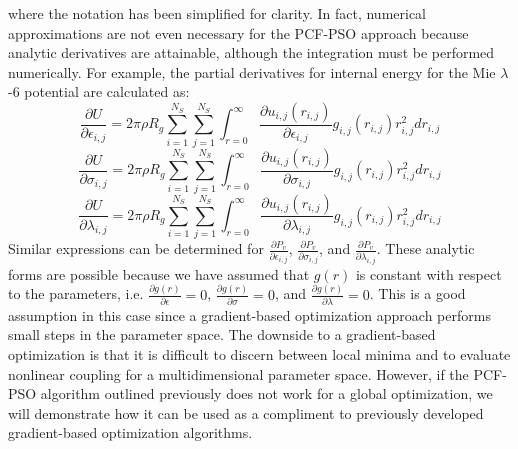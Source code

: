 \documentclass[12pt]{article}
\begin{document}
where the notation has been simplified for clarity. In fact, numerical approximations are not even necessary for the PCF-PSO approach because analytic derivatives are attainable, although the integration must be performed numerically. For example, the partial derivatives for internal energy for the Mie $\lambda$-6 potential are calculated as:
\begin{equation} \label{U_Eps}
\frac{\partial U}{\partial \epsilon_{i,j}} = 2 \pi \rho R_g \sum_{i=1}^{N_S} \sum_{j=1}^{N_S} \int_{r=0}^{\infty} \frac{\partial u_{i,j}(r_{i,j})}{\partial \epsilon_{i,j}} g_{i,j}(r_{i,j}) r_{i,j}^2 dr_{i,j}
\end{equation}
\begin{equation} \label{U_sig}
\frac{\partial U}{\partial \sigma_{i,j}} = 2 \pi \rho R_g \sum_{i=1}^{N_S} \sum_{j=1}^{N_S} \int_{r=0}^{\infty} \frac{\partial u_{i,j}(r_{i,j})}{\partial \sigma_{i,j}} g_{i,j}(r_{i,j}) r_{i,j}^2 dr_{i,j}
\end{equation}
\begin{equation} \label{U_lam}
\frac{\partial U}{\partial \lambda_{i,j}} = 2 \pi \rho R_g \sum_{i=1}^{N_S} \sum_{j=1}^{N_S} \int_{r=0}^{\infty} \frac{\partial u_{i,j}(r_{i,j})}{\partial \lambda_{i,j}} g_{i,j}(r_{i,j}) r_{i,j}^2 dr_{i,j}
\end{equation}
Similar expressions can be determined for $\frac{\partial P_v}{\partial \epsilon_{i,j}}$, $\frac{\partial P_v}{\partial \sigma_{i,j}}$, and $\frac{\partial P_v}{\partial \lambda_{i,j}}$. These analytic forms are possible because we have assumed that $g(r)$ is constant with respect to the parameters, i.e. $\frac{\partial g(r)}{\partial \epsilon} = 0$, $\frac{\partial g(r)}{\partial \sigma} = 0$, and $\frac{\partial g(r)}{\partial \lambda} = 0$. This is a good assumption in this case since a gradient-based optimization approach performs small steps in the parameter space. The downside to a gradient-based optimization is that it is difficult to discern between local minima and to evaluate nonlinear coupling for a multidimensional parameter space. However, if the PCF-PSO algorithm outlined previously does not work for a global optimization, we will demonstrate how it can be used as a compliment to previously developed gradient-based optimization algorithms. 
\end{document}
